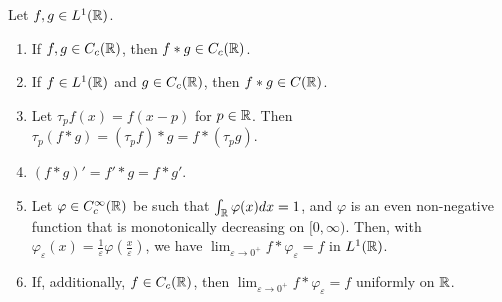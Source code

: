 \begin{proposition}
    Let $f,g \in L^{1}(\mathbb{R})$.
    \begin{enumerate}
        \item If $f,g \in C_{c}(\mathbb{R})$, then $f \ast g \in C_{c}(\mathbb{R})$.
        \item If $f \in L^{1}(\mathbb{R})$ and $g \in C_{c}(\mathbb{R})$, then $f \ast g \in C(\mathbb{R})$.
        \item Let $\tau_{p}f(x) = f(x-p)$ for $p \in \mathbb{R}$. Then $\tau_{p}(f \ast g) = (\tau_{p}f) \ast g = f \ast (\tau_{p}g)$.
        \item $(f \ast g)' = f' \ast g = f \ast g'$.
        \item Let $\varphi \in C_{c}^{\infty}(\mathbb{R})$ be such that $\int_{\mathbb{R}} \varphi(x) dx = 1$, and $\varphi$ is an even non-negative function that is monotonically decreasing on $[0,\infty)$. Then, with $\varphi_{\varepsilon}(x) = \frac{1}{\varepsilon} \varphi(\frac{x}{\varepsilon})$, we have $\lim_{\varepsilon \to 0^{+}} f \ast \varphi_{\varepsilon} = f$ in $L^{1}(\mathbb{R})$.
        \item If, additionally, $f \in C_{c}(\mathbb{R})$, then $\lim_{\varepsilon \to 0^{+}} f \ast \varphi_{\varepsilon} = f$ uniformly on $\mathbb{R}$.
    \end{enumerate}
\end{proposition}
